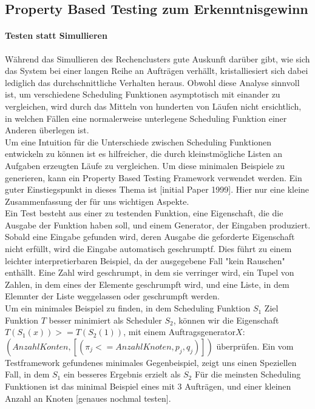 \subsection{Property Based Testing zum Erkenntnisgewinn}

\paragraph{Testen statt Simullieren}
Während das Simullieren des Rechenclusters gute Auskunft darüber gibt, wie sich das System bei einer langen Reihe an Aufträgen verhällt, kristalliesiert sich dabei lediglich das durchschnittliche Verhalten heraus. Obwohl diese Analyse sinnvoll ist, um verschiedene Scheduling Funktionen asymptotisch mit einander zu vergleichen, wird durch das Mitteln von hunderten von Läufen nicht ersichtlich, in welchen Fällen eine normalerweise unterlegene Scheduling Funktion einer Anderen überlegen ist.\\
Um eine Intuition für die Unterschiede zwischen Scheduling Funktionen entwickeln zu können ist es hilfreicher, die durch kleinstmögliche Listen an Aufgaben erzeugten Läufe zu vergleichen. Um diese minimalen Beispiele zu generieren, kann ein Property Based Testing Framework verwendet werden. Ein guter Einstiegspunkt in dieses Thema ist [initial Paper 1999]. Hier nur eine kleine Zusammenfassung der für uns wichtigen Aspekte. \\
Ein Test besteht aus einer zu testenden Funktion, eine Eigenschaft, die die Ausgabe der Funktion haben soll, und einem Generator, der Eingaben produziert. Sobald eine Eingabe gefunden wird, deren Ausgabe die geforderte Eigenschaft nicht erfüllt, wird die Eingabe automatisch geschrumptf. Dies führt zu einem leichter interpretierbaren Beispiel, da der ausgegebene Fall "kein Rauschen" enthällt.
Eine Zahl wird geschrumpt, in dem sie verringer wird, ein Tupel von Zahlen, in dem eines der Elemente geschrumpft wird, und eine Liste, in dem Elemnter der Liste weggelassen oder geschrumpft werden.\\
Um ein minimales Beispiel zu finden, in dem Scheduling Funktion $S_1$ Ziel Funktion $T$ besser minimiert als Scheduler $S_2$, können wir die Eigenschaft $T(S_1(x)) >= T (S_2(1))$, mit einem Auftragsgenerator$X$: $(Anzahl Konten,[(\pi_j <= Anzahl Knoten,p_j,q_j)])$ überprüfen.
Ein vom Testframework gefundenes minimales Gegenbeispiel, zeigt uns einen Speziellen Fall, in dem $S_1$ ein besseres Ergebnis erzielt als $S_2$
Für die meinsten Scheduling Funktionen ist das minimal Beispiel eines mit 3 Aufträgen, und einer kleinen Anzahl an Knoten [genaues nochmal testen].


